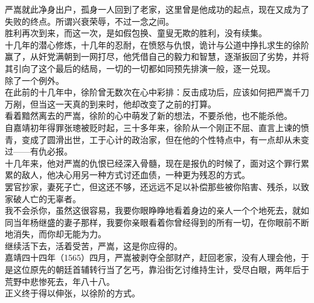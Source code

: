 \begin{multicols}{\theparacolNo}
严嵩就此净身出户，孤身一人回到了老家，这里曾是他成功的起点，现在又成为了失败的终点。所谓兴衰荣辱，不过一念之间。\\

胜利再次到来，而这一次，是如假包换、童叟无欺的胜利，没有续集。\\

十几年的潜心修炼，十几年的忍耐，在愤怒与仇恨，诡计与公道中挣扎求生的徐阶赢了，从奸党满朝到一网打尽，他凭借自己的毅力和智慧，逐渐扳回了劣势，并将其引向了这个最后的结局，一切的一切都如同预先排演一般，逐一兑现。\\

除了一个例外。\\

在此前的十几年中，徐阶曾无数次在心中彩排：反击成功后，应该如何把严嵩千刀万剐，但当这一天真的到来时，他却改变了之前的打算。\\

看着黯然离去的严嵩，徐阶的心中萌发了新的想法，不要杀他，也不能杀他。\\

自嘉靖初年得罪张璁被贬时起，三十多年来，徐阶从一个刚正不屈、直言上谏的愤青，变成了圆滑出世，工于心计的政治家，但在他的个性特点中，有一点却从未变过——有仇必报。\\

十几年来，他对严嵩的仇恨已经深入骨髓，现在是报仇的时候了，面对这个罪行累累的敌人，他决心用另一种方式讨还血债，一种更为残忍的方式。\\

罢官抄家，妻死子亡，但这还不够，还远远不足以补偿那些被你陷害、残杀，以致家破人亡的无辜者。\\

我不会杀你，虽然这很容易，我要你眼睁睁地看着身边的亲人一个个地死去，就如同当年杨继盛的妻子那样，我要你亲眼看着你曾经得到的所有一切，在你眼前不断地消失，而你却无能为力。\\

继续活下去，活着受苦，严嵩，这是你应得的。\\

嘉靖四十四年（1565）四月，严嵩被剥夺全部财产，赶回老家，没有人理会他，于是这位原先的朝廷首辅转行当了乞丐，靠沿街乞讨维持生计，受尽白眼，两年后于荒野中悲惨死去，年八十八。\\

正义终于得以伸张，以徐阶的方式。\\

\ifnum{}
	\end{multicols}
\fi
\newpage
